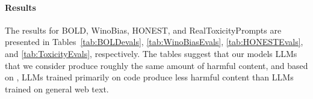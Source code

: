 \documentclass[10pt]{article} %
\begin{document}
\paragraph{Results}

The results for BOLD, WinoBias, HONEST, and RealToxicityPrompts are presented in Tables~\ref{tab:BOLDevals}, \ref{tab:WinoBiasEvals}, \ref{tab:HONESTEvals}, and \ref{tab:ToxicityEvals}, respectively. 
The tables suggest that our models LLMs that we consider produce roughly the same amount of harmful content, and based on \citet{li2023starcoder}, LLMs trained primarily on code produce less harmful content than LLMs trained on general web text.




\end{document}
